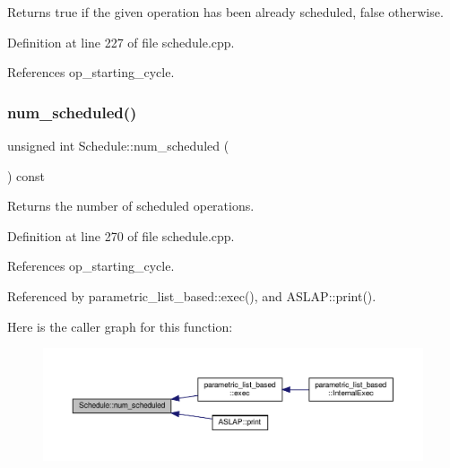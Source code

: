 Returns true if the given operation has been already scheduled, false otherwise. 



Definition at line 227 of file schedule.\+cpp.



References op\+\_\+starting\+\_\+cycle.

\mbox{\label{classSchedule_a93bef5f10d60f02ab62a87bf65a5ae70}} 
\subsubsection{\texorpdfstring{num\+\_\+scheduled()}{num\_scheduled()}}
{\footnotesize\ttfamily unsigned int Schedule\+::num\+\_\+scheduled (\begin{DoxyParamCaption}{ }\end{DoxyParamCaption}) const}



Returns the number of scheduled operations. 



Definition at line 270 of file schedule.\+cpp.



References op\+\_\+starting\+\_\+cycle.



Referenced by parametric\+\_\+list\+\_\+based\+::exec(), and A\+S\+L\+A\+P\+::print().

Here is the caller graph for this function\+:
\nopagebreak
\begin{figure}[H]
\begin{center}
\leavevmode
\includegraphics[width=350pt]{df/d61/classSchedule_a93bef5f10d60f02ab62a87bf65a5ae70_icgraph}
\end{center}
\end{figure}
\mbox{\label{classSchedule_ad25e768e9aeea647c95939f49b46ce7a}} 
